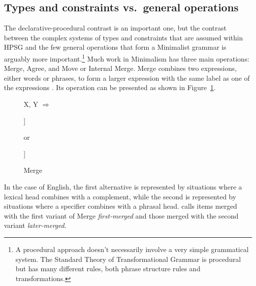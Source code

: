 \documentclass[output=paper
                ,modfonts
                ,nonflat
	        ,collection
	        ,collectionchapter
	        ,collectiontoclongg
 	        ,biblatex
                ,babelshorthands
                ,newtxmath
                ,draftmode
                ,colorlinks, citecolor=brown
]{./langsci/langscibook}
\begin{document}


\subsection{Types and constraints vs.\ general operations}
\label{sec-types-vs-operations}

The declarative-procedural contrast is an important one, but the contrast between the complex
systems of types and constraints that are assumed within HPSG and the few general operations that
form a Minimalist grammar is arguably more important.\footnote{%
  A procedural approach doesn't necessarily involve a very simple grammatical system. The Standard
  Theory of Transformational Grammar \citep{Chomsky65a} is procedural but has many different rules,
  both phrase structure rules and transformations.}
Much work in Minimalism has three main operations: Merge, Agree, and Move or Internal Merge. Merge
combines two expressions, either words or phrases, to form a larger expression with the same label
as one of the expressions \parencites[244]{Chomsky95a-u}[]{Chomsky2008a}. Its operation can be presented as shown in Figure~\ref{fig:min-merge}.
\begin{figure}
\centering
	X, Y $\Rightarrow$
	\hspace{1em}
	\begin{forest} %
		[X [X,baseline] [Y]]
	\end{forest}
\hspace{1em}
{or}
\hspace{1em}
	\begin{forest} %
		[Y [X,baseline] [Y]]
	\end{forest}
	\caption{\label{fig:min-merge}Merge}
\end{figure}
In the case of English, the first alternative is represented by situations where a lexical head
combines with a complement, while the second is represented by situations where a specifier combines
with a phrasal head. \citet[]{Chomsky2008a} calls items merged with the first variant of Merge \emph{first-merged}
and those merged with the second variant \emph{later-merged}.
\end{document}
